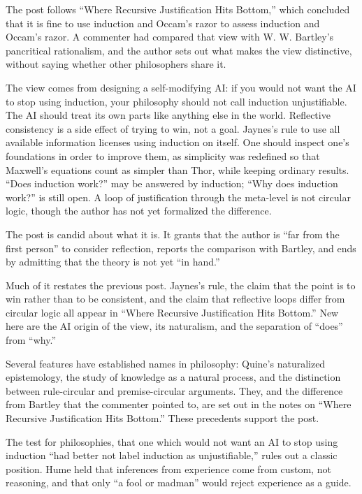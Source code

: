 \begin{afterword}
\summaryhead

The post follows ``Where Recursive Justification Hits Bottom,'' which concluded that it is fine to use induction and Occam's razor to assess induction and Occam's razor. A commenter had compared that view with W. W. Bartley's pancritical rationalism, and the author sets out what makes the view distinctive, without saying whether other philosophers share it.

The view comes from designing a self-modifying AI: if you would not want the AI to stop using induction, your philosophy should not call induction unjustifiable. The AI should treat its own parts like anything else in the world. Reflective consistency is a side effect of trying to win, not a goal. Jaynes's rule to use all available information licenses using induction on itself. One should inspect one's foundations in order to improve them, as simplicity was redefined so that Maxwell's equations count as simpler than Thor, while keeping ordinary results. ``Does induction work?'' may be answered by induction; ``Why does induction work?'' is still open. A loop of justification through the meta-level is not circular logic, though the author has not yet formalized the difference.

\responsehead

The post is candid about what it is. It grants that the author is ``far from the first person'' to consider reflection, reports the comparison with Bartley, and ends by admitting that the theory is not yet ``in hand.''

Much of it restates the previous post. Jaynes's rule, the claim that the point is to win rather than to be consistent, and the claim that reflective loops differ from circular logic all appear in ``Where Recursive Justification Hits Bottom.'' New here are the AI origin of the view, its naturalism, and the separation of ``does'' from ``why.''

Several features have established names in philosophy: Quine's naturalized epistemology, the study of knowledge as a natural process, and the distinction between rule-circular and premise-circular arguments. They, and the difference from Bartley that the commenter pointed to, are set out in the notes on ``Where Recursive Justification Hits Bottom.'' These precedents support the post.

The test for philosophies, that one which would not want an AI to stop using induction ``had better not label induction as unjustifiable,'' rules out a classic position. Hume held that inferences from experience come from custom, not reasoning, and that only ``a fool or madman'' would reject experience as a guide.


\end{afterword}
